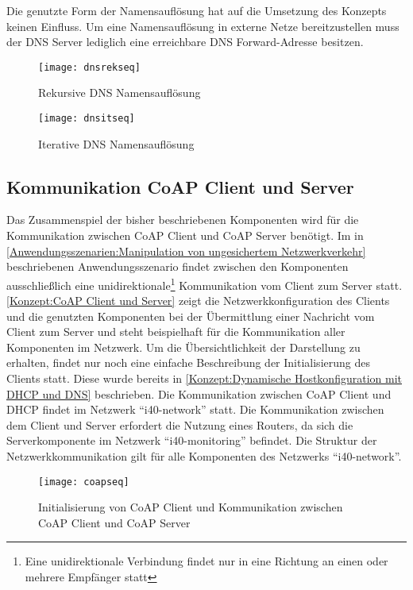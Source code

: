 Die genutzte Form der Namensauflösung hat auf die Umsetzung des Konzepts keinen Einfluss. Um eine Namensauflösung in externe Netze bereitzustellen muss der \ac{DNS} Server lediglich eine erreichbare \ac{DNS} Forward-Adresse besitzen.  

\begin{figure}[h]
  \centering
  \texttt{[image: dnsrekseq]}
  \caption{Rekursive DNS Namensauflösung} 
  \label{Konzept:Rekursive DNS Namensauflösung}
\end{figure}

\begin{figure}[h]
  \centering
  \texttt{[image: dnsitseq]}
  \caption{Iterative DNS Namensauflösung} 
  \label{Konzept:Iterative DNS Namensauflösung}
\end{figure}

\subsection{Kommunikation CoAP Client und Server}
Das Zusammenspiel der bisher beschriebenen Komponenten wird für die Kommunikation zwischen \ac{CoAP} Client und \ac{CoAP} Server benötigt. Im in \autoref{Anwendungsszenarien:Manipulation von ungesichertem Netzwerkverkehr} beschriebenen Anwendungsszenario findet zwischen den Komponenten ausschließlich eine unidirektionale\footnote{Eine unidirektionale Verbindung findet nur in eine Richtung an einen oder mehrere Empfänger statt} Kommunikation vom Client zum Server statt. \autoref{Konzept:CoAP Client und Server} zeigt die Netzwerkkonfiguration des Clients und die genutzten Komponenten bei der Übermittlung einer Nachricht vom Client zum Server und steht beispielhaft für die Kommunikation aller Komponenten im Netzwerk. Um die Übersichtlichkeit der Darstellung zu erhalten, findet nur noch eine einfache Beschreibung der Initialisierung des Clients statt. Diese wurde bereits in \autoref{Konzept:Dynamische Hostkonfiguration mit DHCP und DNS} beschrieben. Die Kommunikation zwischen \ac{CoAP} Client und \ac{DHCP} findet im Netzwerk "`i40-network"' statt. Die Kommunikation zwischen dem Client und Server erfordert die Nutzung eines Routers, da sich die Serverkomponente im Netzwerk "`i40-monitoring"' befindet. Die Struktur der Netzwerkkommunikation gilt für alle Komponenten des Netzwerks "`i40-network"'.

\begin{figure}[h]
  \centering
  \texttt{[image: coapseq]}
  \caption{Initialisierung von CoAP Client und Kommunikation zwischen CoAP Client und CoAP Server} 
  \label{Konzept:CoAP Client und Server}
\end{figure}

